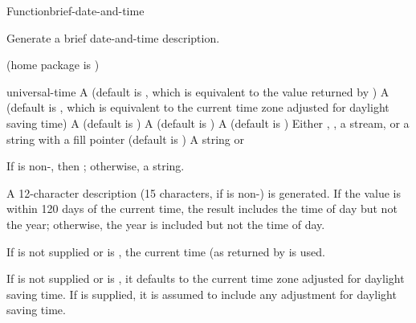 \documentclass[10pt,twoside,english,pdftex]{article}
\begin{document}
\begin{functiondoc}{Function}{brief-date-and-time}{%
    }
% 
% 

\fnsyntax

\fnpurpose Generate a brief date-and-time description.

\fnpackage {} (home package is )

\fnmodule {}

\fnargs
\begin{args}{universal-time}
 A  (default is \nil,
  which is equivalent to the value returned by
  )
 A  (default is \nil,
  which is equivalent to the current time zone adjusted for daylight
  saving time)
 A  (default is 
  )
 A  (default is \nil)
 A  (default is \nil)
\arg[destination] Either \nil, , a stream, or a string with a fill 
pointer (default is \nil)
\arg[result] A string or \nil{}
\end{args}

\fnreturns If  is non-\nil, then \nil; otherwise, a string.

\fndescription A 12-character description (15 characters, if
 is non-\nil{}) is generated.  If the
 value is within 120 days of the current time,
the result  includes the time of day but not the year;
otherwise, the year is included but not the time of day.

\W{} 
%
%
If  is not supplied or is \nil, the current time
(as returned by  is used.

\W{} 
%
If  is not supplied or is \nil, it defaults to the
current time zone adjusted for daylight saving time. If
 is supplied, it is assumed to include any adjustment
for daylight saving time.


\end{functiondoc}
\end{document}
